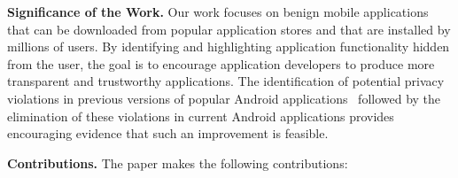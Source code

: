 \noindent 
{\bf Significance of the Work.}  Our work focuses on benign mobile
applications that can be downloaded from popular application stores
and that are installed by millions of users.  By identifying and
highlighting application functionality hidden from the user, the goal
is to encourage application developers to produce more transparent and
trustworthy applications. The identification of potential privacy
violations in previous versions of popular Android
applications~\cite{Enck:Gilbert:Chun:Cox:Jung:McDaniel:Sheth:OSDI10,Egele:Kruegel:Kirda:Vign:NDSS11,Tripp:Rubin:SEC14} followed by the
elimination of these violations in current Android applications
provides encouraging evidence that such an improvement is feasible.

\noindent 
{\bf Contributions.}
The paper makes the following contributions:

